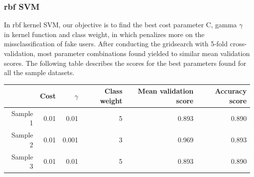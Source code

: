 \documentclass[a4paper, 12pt]{report}
\begin{document}
\subsubsection*{rbf SVM}
In rbf kernel SVM, our objective is to find the best cost parameter C, gamma $\gamma$ in kernel function and class weight, in which penalizes more on the missclassification of fake users. After conducting the gridsearch with 5-fold cross-validation, most parameter combinations found yielded to similar mean validation scores. The following table describes the scores for the best parameters found for all the sample datasets. 

\begin{table}[h!]
	 \label{tab:title} 
	\begin{center}
		\begin{tabular}{rrrrrr}
			\hline
			& Cost & $\gamma$ & Class weight & Mean validation score & Accuracy score\\
			\hline
			Sample 1 & 0.01 & 0.01 & 5 & 0.893 & 0.890\\
			Sample 2 & 0.01 & 0.001 & 3 & 0.969 & 0.893\\
			Sample 3 & 0.01 & 0.01 & 5 & 0.893 & 0.890\\
			\hline
		\end{tabular}
	\end{center}
\end{table}
\end{document}
